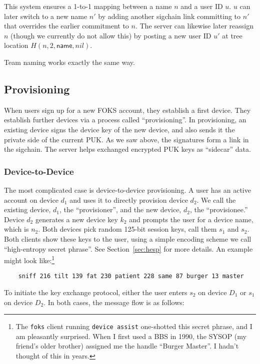 This system ensures a 1-to-1 mapping between a name $n$ and a
user ID $u$. $u$ can later switch to a new name $n'$ by adding
another sigchain link committing to $n'$ that overrides the earlier
commitment to $n$. The server can likewise later reassign $n$
(though we currently do not allow this) by posting a new user ID
$u'$ at tree location $H(n, 2, \textsf{name}, nil)$.

Team naming works exactly the same way.

\subsection{Provisioning}

When users sign up for a new FOKS account, they establish a first device. They
establish further devices via a process called ``provisioning''. In
provisioning, an existing device signs the device key of the new device, and
also sends it the private side of the current PUK. As we saw above, the
signatures form a link in the sigchain. The server helps exchanged encrypted PUK
keys as ``sidecar'' data.

\subsubsection{Device-to-Device}
\label{sec:kex}

The most complicated case is device-to-device provisioning. A user has an
active account on device $d_1$ and uses it to directly provision device $d_2$.
We call the existing device, $d_1$, the ``provisioner'', and the new device, $d_2$,
the ``provisionee.''
Device $d_2$ generates a new device key $k_2$ and prompts the user for
a device name, which is $n_2$.
Both devices pick random 125-bit session keys, call them $s_1$ and $s_2$. Both clients
show these keys to the user, using a simple encoding scheme we call
``high-entropy secret phrase''. See Section~\ref{sec:hesp} for more details.
An example might look like:\footnote{The \texttt{foks} client
running \texttt{device assist} one-shotted this secret phrase, and I am pleasantly surprised.
When I first used a BBS in 1990, the SYSOP (my friend's older brother) assigned me the 
handle ``Burger Master''. I hadn't thought of this in years.}

\begin{verbatim}
    sniff 216 tilt 139 fat 230 patient 228 same 87 burger 13 master
\end{verbatim}

To initiate the key exchange protocol, either the user enters $s_2$ on device $D_1$
or $s_1$ on device $D_2$. In both cases, the message flow is as follows:

